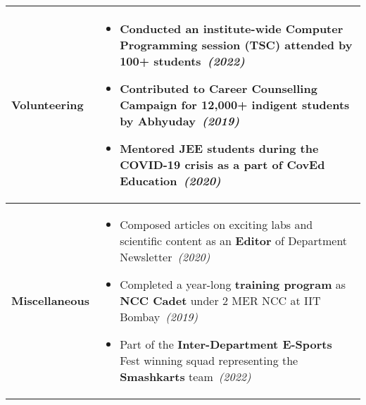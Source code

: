 \documentclass[10pt, a4paper]{article}
\newcommand{\rhsmall}[1]{\hfill{\footnotesize{\textsl{(#1)}}}}
\begin{document}
\begin{tabular}{p{0.99in}p{6.01in}}
\small\textbf{Volunteering} & \vspace{-0.5em}%
\begin{itemize}
	\item Conducted an institute-wide \textbf{Computer Programming} session (TSC) attended by {100+ students}\ \rhsmall{2022}%
	\item Contributed to Career Counselling Campaign for 12,000+ indigent students by \textbf{Abhyuday}\ \rhsmall{2019}
	\item \textbf{Mentored} JEE students during the \textbf{COVID-19} crisis as a part of \textbf{CovEd Education}\ \rhsmall{2020}%
\end{itemize}\\[-1em]\hline
\vspace{-0.5em}
\small\textbf{Miscellaneous}	& \vspace{-0.5em}
\begin{itemize}
	\item Composed articles on exciting labs and scientific content as an \textbf{Editor} of Department Newsletter\ \rhsmall{2020}%
	\item Completed a year-long \textbf{training program} as \textbf{NCC Cadet} under 2 MER NCC at IIT Bombay\ \rhsmall{2019}%
	\item Part of the \textbf{Inter-Department E-Sports} Fest winning squad representing the \textbf{Smashkarts} team\ \rhsmall{2022}
\end{itemize}%

\end{tabular}
\end{document}
